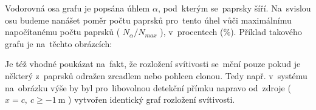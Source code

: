 Vodorovná osa grafu je popsána úhlem $\alpha$, pod~kterým se~paprsky šíří. Na~svislou osu budeme nanášet poměr počtu paprsků pro~tento úhel vůči maximálnímu napočítanému počtu paprsků ( $ N_\alpha / N_{max} $ ), v~procentech ($\mathrm{\%}$). Příklad takového grafu je na~těchto obrázcích:


Je též vhodné poukázat na~fakt, že rozložení svítivosti se~mění pouze pokud je některý z~paprsků odražen zrcadlem nebo pohlcen clonou. Tedy např. v~systému na~obrázku výše by byl pro~libovolnou detekční přímku napravo od~zdroje ( $x = c,\ c \geq -1\ \mathrm{m}$ ) vytvořen identický graf rozložení svítivosti.